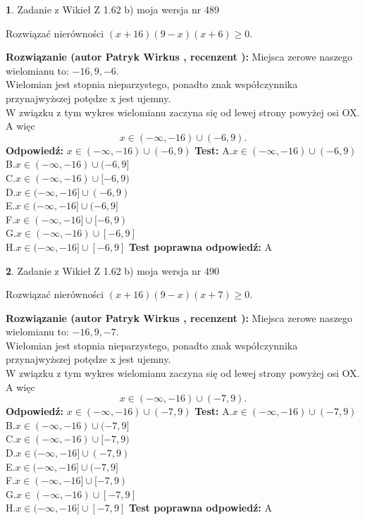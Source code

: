 \documentclass[12pt, a4paper]{article}
\theoremstyle{definition} %
\newtheorem{zad}{}
\newcommand{\zadStart}[1]{\begin{zad}#1\newline}
\newcommand{\zadStop}{\end{zad}}
\newcommand{\rozwStart}[2]{\noindent \textbf{Rozwiązanie (autor #1 , recenzent #2): }\newline}
\newcommand{\rozwStop}{\newline}
\newcommand{\odpStart}{\noindent \textbf{Odpowiedź:}\newline}
\newcommand{\odpStop}{\newline}
\newcommand{\testStart}{\noindent \textbf{Test:}\newline}
\newcommand{\testStop}{\newline}
\newcommand{\kluczStart}{\noindent \textbf{Test poprawna odpowiedź:}\newline}
\newcommand{\kluczStop}{\newline}
\begin{document}
\zadStart{Zadanie z Wikieł Z 1.62 b) moja wersja nr 489}

Rozwiązać nierówności $(x+16)(9-x)(x+6)\ge0$.
\zadStop
\rozwStart{Patryk Wirkus}{}
Miejsca zerowe naszego wielomianu to: $-16, 9, -6$.\\
Wielomian jest stopnia nieparzystego, ponadto znak współczynnika przy\linebreak najwyższej potędze x jest ujemny.\\ W związku z tym wykres wielomianu zaczyna się od lewej strony powyżej osi OX. A więc $$x \in (-\infty,-16) \cup (-6,9).$$
\rozwStop
\odpStart
$x \in (-\infty,-16) \cup (-6,9)$
\odpStop
\testStart
A.$x \in (-\infty,-16) \cup (-6,9)$\\
B.$x \in (-\infty,-16) \cup (-6,9]$\\
C.$x \in (-\infty,-16) \cup [-6,9)$\\
D.$x \in (-\infty,-16] \cup (-6,9)$\\
E.$x \in (-\infty,-16] \cup (-6,9]$\\
F.$x \in (-\infty,-16] \cup [-6,9)$\\
G.$x \in (-\infty,-16) \cup [-6,9]$\\
H.$x \in (-\infty,-16] \cup [-6,9]$
\testStop
\kluczStart
A
\kluczStop



\zadStart{Zadanie z Wikieł Z 1.62 b) moja wersja nr 490}

Rozwiązać nierówności $(x+16)(9-x)(x+7)\ge0$.
\zadStop
\rozwStart{Patryk Wirkus}{}
Miejsca zerowe naszego wielomianu to: $-16, 9, -7$.\\
Wielomian jest stopnia nieparzystego, ponadto znak współczynnika przy\linebreak najwyższej potędze x jest ujemny.\\ W związku z tym wykres wielomianu zaczyna się od lewej strony powyżej osi OX. A więc $$x \in (-\infty,-16) \cup (-7,9).$$
\rozwStop
\odpStart
$x \in (-\infty,-16) \cup (-7,9)$
\odpStop
\testStart
A.$x \in (-\infty,-16) \cup (-7,9)$\\
B.$x \in (-\infty,-16) \cup (-7,9]$\\
C.$x \in (-\infty,-16) \cup [-7,9)$\\
D.$x \in (-\infty,-16] \cup (-7,9)$\\
E.$x \in (-\infty,-16] \cup (-7,9]$\\
F.$x \in (-\infty,-16] \cup [-7,9)$\\
G.$x \in (-\infty,-16) \cup [-7,9]$\\
H.$x \in (-\infty,-16] \cup [-7,9]$
\testStop
\kluczStart
A
\kluczStop
\end{document}
